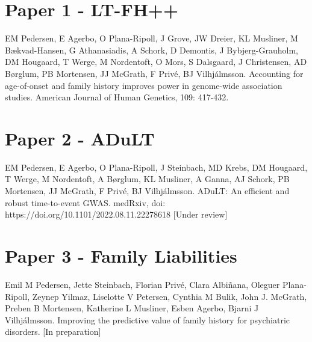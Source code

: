 \documentclass[a4paper, twoside]{report}
\begin{document}
\begin{appendices}
\chapter{Paper 1 - LT-FH++} \label{app:ltfhpp}
\thispagestyle{empty}
EM Pedersen, E Agerbo, O Plana-Ripoll, J Grove, JW Dreier, KL Musliner, M Bækvad-Hansen, G Athanasiadis, A Schork, D Demontis, J Bybjerg-Grauholm, DM Hougaard, T Werge, M Nordentoft, O Mors, S Dalsgaard, J Christensen,  AD Børglum, PB Mortensen, JJ McGrath, F Privé, BJ Vilhjálmsson. Accounting for age-of-onset and family history improves power in genome-wide association studies. American Journal of Human Genetics, 109: 417-432.




\chapter{Paper 2 - ADuLT}\label{app:adult}
\thispagestyle{empty}
EM Pedersen, E Agerbo, O Plana-Ripoll, J Steinbach, MD Krebs, DM Hougaard, T Werge, M Nordentoft, A Børglum,  KL Musliner, A Ganna, AJ Schork, PB Mortensen,  JJ McGrath,  F Privé, BJ Vilhjálmsson. ADuLT: An efficient and robust time-to-event GWAS. medRxiv, doi: https://doi.org/10.1101/2022.08.11.22278618 [Under review]




\chapter{Paper 3 - Family Liabilities}\label{app:fl}
\thispagestyle{empty}
Emil M Pedersen, Jette Steinbach, Florian Privé, Clara Albiñana, Oleguer Plana-Ripoll, Zeynep Yilmaz, Liselotte V Petersen, Cynthia M Bulik, John J. McGrath, Preben B Mortensen, Katherine L Musliner, Esben Agerbo, Bjarni J Vilhjálmsson. Improving the predictive value of family history for psychiatric disorders. [In preparation]





\end{appendices}
\end{document}
